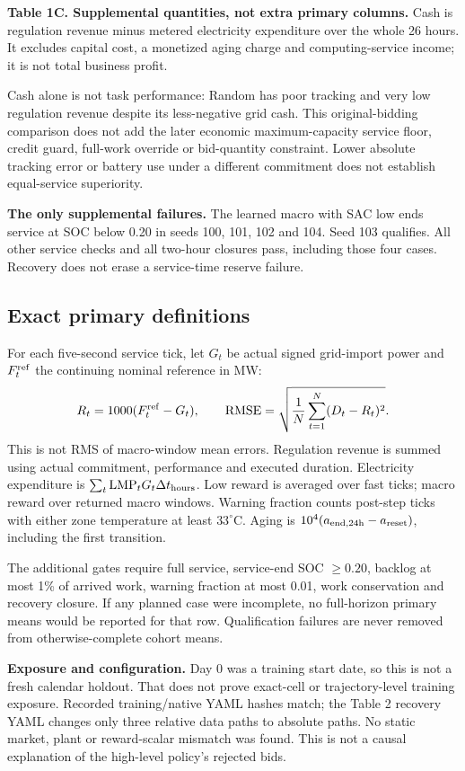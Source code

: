 \documentclass[10pt]{article}
\begin{document}
\textbf{Table 1C. Supplemental quantities, not extra primary columns.}
Cash is regulation revenue minus metered electricity expenditure over
the whole 26 hours. It excludes capital cost, a monetized aging charge
and computing-service income; it is not total business profit.
\begin{center}\small
\SupplementalTable
\end{center}

Cash alone is not task performance: Random has poor tracking and very low
regulation revenue despite its less-negative grid cash. This original-bidding
comparison does not add the later economic maximum-capacity service floor,
credit guard, full-work override or bid-quantity constraint.
Lower absolute tracking error or battery use under a different commitment
does not establish equal-service superiority.

\textbf{The only supplemental failures.}
The learned macro with SAC low ends service at SOC below 0.20 in seeds
100, 101, 102 and 104. Seed 103 qualifies. All other service checks and
all two-hour closures pass, including those four cases.
Recovery does not erase a service-time reserve failure.

\subsection*{Exact primary definitions}
For each five-second service tick, let $G_t$ be actual signed grid-import
power and $F_t^{\rm ref}$ the continuing nominal reference in MW:
\[
 R_t=1000(F_t^{\rm ref}-G_t),\qquad
 {\rm RMSE}=\sqrt{\frac{1}{N}\sum_{t=1}^N(D_t-R_t)^2}.
\]
This is not RMS of macro-window mean errors. Regulation revenue is summed
using actual commitment, performance and executed duration.
Electricity expenditure is $\sum_t {\rm LMP}_t G_t\Delta t_{\rm hours}$.
Low reward is averaged over fast ticks; macro reward over returned macro
windows. Warning fraction counts post-step ticks with either zone
temperature at least $33^\circ$C. Aging is
$10^4(a_{\rm end,24h}-a_{\rm reset})$, including the first transition.

The additional gates require full service, service-end SOC $\geq0.20$,
backlog at most 1\% of arrived work, warning fraction at most 0.01,
work conservation and recovery closure. If any planned case were incomplete,
no full-horizon primary means would be reported for that row.
Qualification failures are never removed from otherwise-complete cohort means.

\textbf{Exposure and configuration.}
Day 0 was a training start date, so this is not a fresh calendar holdout.
That does not prove exact-cell or trajectory-level training exposure.
Recorded training/native YAML hashes match; the Table 2 recovery YAML changes
only three relative data paths to absolute paths. No static market, plant
or reward-scalar mismatch was found. This is not a causal explanation of
the high-level policy's rejected bids.
\end{document}
